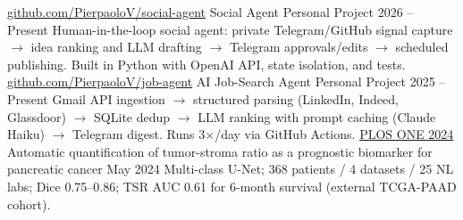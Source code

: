 


\begin{cventries}
    \cventry
        {\href{https://github.com/PierpaoloV/social-agent}{github.com/PierpaoloV/social-agent}}
        {Social Agent}
        {Personal Project}
        {2026 -- Present}
        {Human-in-the-loop social agent: private Telegram/GitHub signal capture $\rightarrow$ idea ranking and LLM drafting $\rightarrow$ Telegram approvals/edits $\rightarrow$ scheduled publishing. Built in Python with OpenAI API, state isolation, and tests.}
    \vspace{1mm}
    \cventry
        {\href{https://github.com/PierpaoloV/job-agent}{github.com/PierpaoloV/job-agent}}
        {AI Job-Search Agent}
        {Personal Project}
        {2025 -- Present}
        {Gmail API ingestion $\rightarrow$ structured parsing (LinkedIn, Indeed, Glassdoor) $\rightarrow$ SQLite dedup $\rightarrow$ LLM ranking with prompt caching (Claude Haiku) $\rightarrow$ Telegram digest. Runs 3$\times$/day via GitHub Actions.}
    \vspace{1mm}
    \cventry
        {\href{https://journals.plos.org/plosone/article?id=10.1371/journal.pone.0301969}{PLOS ONE 2024}}
        {Automatic quantification of tumor-stroma ratio as a prognostic biomarker for pancreatic cancer}
        {}
        {May 2024}
        {Multi-class U-Net; 368 patients / 4 datasets / 25 NL labs; Dice 0.75--0.86; TSR AUC 0.61 for 6-month survival (external TCGA-PAAD cohort).}

\end{cventries}
